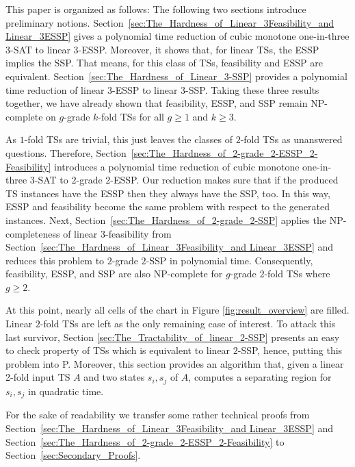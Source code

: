 \documentclass[english]{lipics_hacked}
\begin{document}
This paper is organized as follows:
The following two sections introduce preliminary notions.
Section~\ref{sec:The_Hardness_of_Linear_3Feasibility_and Linear_3ESSP} gives a polynomial time reduction of cubic monotone one-in-three $3$-SAT to linear $3$-ESSP.
Moreover, it shows that, for linear TSs, the ESSP implies the SSP. 
That means, for this class of TSs, feasibility and ESSP are equivalent.
Section~\ref{sec:The_Hardness_of_Linear_3-SSP} provides a polynomial time reduction of linear $3$-ESSP to linear $3$-SSP.
Taking these three results together, we have already shown that feasibility, ESSP, and SSP remain NP-complete on $g$-grade $k$-fold TSs for all $g \geq 1$ and $k \geq 3$.

As $1$-fold TSs are trivial, this just leaves the classes of $2$-fold TSs as unanswered questions. 
Therefore, Section~\ref{sec:The_Hardness_of_2-grade_2-ESSP_2-Feasibility} introduces a polynomial time reduction of cubic monotone one-in-three $3$-SAT to $2$-grade $2$-ESSP.
Our reduction makes sure that if the produced TS instances have the ESSP then they always have the SSP, too.
In this way, ESSP and feasibility become the same problem with respect to the generated instances.
Next, Section~\ref{sec:The_Hardness_of_2-grade_2-SSP} applies the NP-completeness of linear $3$-feasibility from Section~\ref{sec:The_Hardness_of_Linear_3Feasibility_and Linear_3ESSP} and reduces this problem to $2$-grade $2$-SSP in polynomial time.
Consequently, feasibility, ESSP, and SSP are also NP-complete for $g$-grade $2$-fold TSs where $g \geq 2$.

At this point, nearly all cells of the chart in Figure \ref{fig:result_overview} are filled.
Linear $2$-fold TSs are left as the only remaining case of interest.
To attack this last survivor, Section \ref{sec:The_Tractability_of_linear_2-SSP} presents an easy to check property of TSs which is equivalent to linear $2$-SSP, hence, putting this problem into P.
Moreover, this section provides an algorithm that, given a linear 2-fold input TS $A$ and two states $s_i,s_j$ of $A$, computes a separating region for $s_i,s_j$ in quadratic time.

For the sake of readability we transfer some rather technical proofs from Section~\ref{sec:The_Hardness_of_Linear_3Feasibility_and Linear_3ESSP} and Section~\ref{sec:The_Hardness_of_2-grade_2-ESSP_2-Feasibility} to Section~\ref{sec:Secondary_Proofs}.

\end{document}
